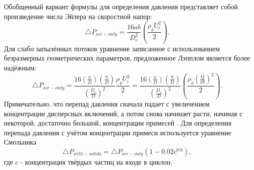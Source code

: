 		Обобщенный вариант формулы для определения давления представляет собой произведение числа Эйлера на скоростной напор:
		\begin{equation}
			\triangle P_{air-only}  = \frac{16ab}{D_e^2} \left( \frac{\rho_g U_i^2}{2} \right).
		\end{equation}
		Для слабо запылённых потоков уравнение записанное с использованием безразмерных геометрических параметров, предложенное Лэпплом является более надёжным:
		\begin{equation}
			\triangle P_{air-only} = \frac{16\left(\frac{a}{D}\right)\left(\frac{b}{D}\right)}{\left(\frac{D_e}{D}\right)^2} \frac{\rho_g U_i^2}{2} = \frac{16\left(\frac{a}{D}\right)\left(\frac{b}{D}\right)}{\left(\frac{D_e}{D}\right)^2}\left(\frac{\rho_g\left(\frac{Q}{ab}\right)^2}{2}\right).
		\end{equation}
		Примечательно, что перепад давления сначала падает с увеличением концентрации дисперсных включений, а потом снова начинает расти, начиная с некоторой, достаточно большой, концентрации примесей \cite{Shrikant}. Для определения перепада давления с учётом концентрации примеси используется уравнение Смольника \cite{Smolik}
		\begin{equation}
			\triangle P_{with-solids} = \triangle P_{air-only} (1-0.02c^{0.6}),
		\end{equation}
		где $c$ - концентрация твёрдых частиц на входе в циклон.